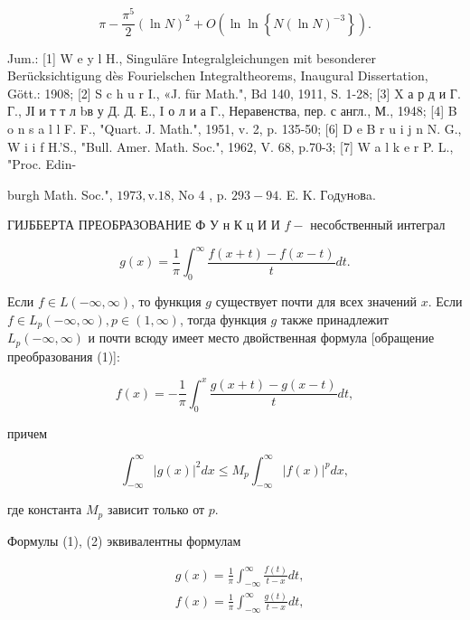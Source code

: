 \documentclass[10pt]{article}
\begin{document}
\[

\pi-\frac{\pi^{5}}{2}(\ln N)^{2}+O\left(\ln \ln \left\{N(\ln N)^{-3}\right\}\right) .

\]



Jum.: [1] W e y l H., Singuläre Integralgleichungen mit besonderer Berücksichtigung dès Fourielschen Integraltheorems, Inaugural Dissertation, Gött.: 1908; [2] S c h u r I., «J. für Math.", Bd 140, 1911, S. 1-28; [3] X а р д и Г. Г., ЈІ и т т л bв у Д. Д. Е., I о л и а Г., Неравенства, пер. с англ., М., 1948; [4] B o n s a l l F. F., "Quart. J. Math.", 1951, v. 2, p. 135-50; [6] D e B r u i j n N. G., W i i f H.'S., "Bull. Amer. Math. Soc.", 1962, V. 68, p.70-3; [7] W a l k e r P. L., "Proc. Edin-

burgh Math. Soc.", $1973, \mathrm{v} .18$, No 4 , p. $293-94$. E. K. Гoдyнoвa.



ГИЈББЕРТА ПРЕОБРАЗОВАНИЕ Ф У н К ц И И $f-$ несобственный интеграл



\[

g(x)=\frac{1}{\pi} \int_{0}^{\infty} \frac{f(x+t)-f(x-t)}{t} d t .

\]



Если $f \in L(-\infty, \infty)$, то функция $g$ существует почти для всех значений $x$. Если $f \in L_{p}(-\infty, \infty), p \in(1, \infty)$, тогда функция $g$ также принадлежит $L_{p}(-\infty, \infty)$ и почти всюду имеет место двойственная формула [обращение преобразования (1)]:



\[

f(x)=-\frac{1}{\pi} \int_{0}^{x} \frac{g(x+t)-g(x-t)}{t} d t,

\]



причем



\[

\int_{-\infty}^{\infty}|g(x)|^{2} d x \leqslant M_{p} \int_{-\infty}^{\infty}|f(x)|^{p} d x,

\]



где константа $M_{p}$ зависит только от $p$.



Формулы (1), (2) эквивалентны формулам



\[

\begin{aligned}

& g(x)=\frac{1}{\pi} \int_{-\infty}^{\infty} \frac{f(t)}{t-x} d t, \\

& f(x)=\frac{1}{\pi} \int_{-\infty}^{\infty} \frac{g(t)}{t-x} d t,

\end{aligned}

\]
\end{document}
